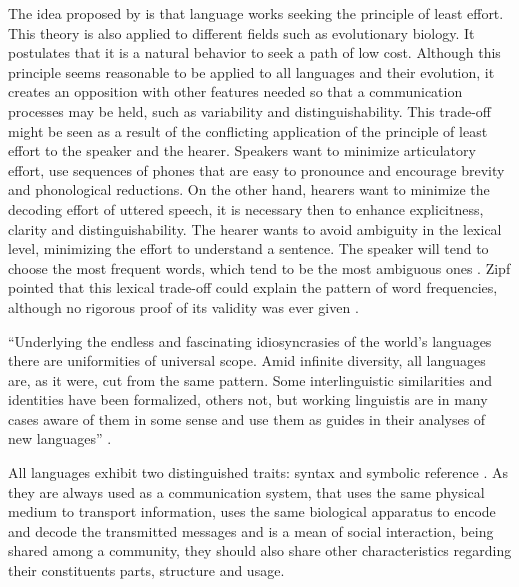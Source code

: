 The idea proposed by \cite{zipf1949} is that language works seeking the principle of least effort. 
This theory is also applied to different fields such as evolutionary biology. It postulates that
it is a natural behavior to seek a path of low cost.
Although this principle seems reasonable to be applied to all languages and their evolution,
it creates an opposition with other features needed so that a communication processes may be held,
such as variability and distinguishability. This trade-off might be seen as a result of the conflicting
application of the principle of least effort to the speaker and the hearer. Speakers want to 
minimize articulatory effort, use sequences of phones that are easy to pronounce and encourage
brevity and phonological reductions. On the other hand, hearers want to minimize the decoding effort
of uttered speech, it is necessary then to enhance explicitness, clarity and distinguishability.
The hearer wants to avoid ambiguity in the lexical level, minimizing the effort to understand a sentence.
The speaker will tend to choose the most frequent words, which tend to be the most ambiguous ones
\citep{gernsbacher1994, kohler1986}.
Zipf pointed that this lexical trade-off could explain the pattern of word frequencies,
although no rigorous proof of its validity was ever given \citep{zipf1949}.
 

``Underlying the endless and fascinating idiosyncrasies of the world's languages there are 
uniformities of universal scope. Amid infinite diversity, all languages are, as it were, 
cut from the same pattern. Some interlinguistic similarities and identities have been formalized, 
others not, but working linguistis are in many cases aware of them in some sense and use them as 
guides in their analyses of new languages'' \citep{greenberg1966}.

All languages exhibit two distinguished traits: syntax and symbolic reference
\citep{chomsky1968b, deacon1997}.
As they are always used as a communication system, that uses the same physical medium to 
transport information, uses the same biological apparatus to encode and decode the transmitted
messages and is a mean of social interaction, being shared among a community, they should also 
share other characteristics regarding their constituents parts, structure and usage.



